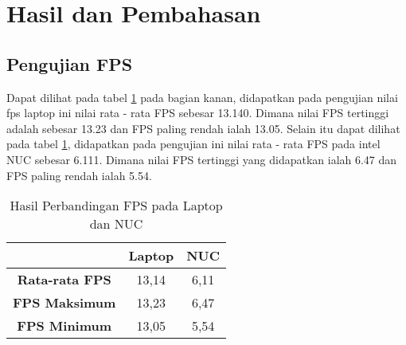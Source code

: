 \section{Hasil dan Pembahasan}
\label{sec:hasildanpembahasan}

\subsection{Pengujian FPS}

Dapat dilihat pada tabel \ref{tb:FPSLaptop} pada bagian kanan, didapatkan pada pengujian nilai fps laptop ini nilai rata - rata FPS sebesar 13.140. Dimana nilai FPS tertinggi adalah sebesar 13.23 dan FPS paling rendah ialah 13.05.  Selain itu dapat dilihat pada tabel \ref{tb:FPSLaptop}, didapatkan pada pengujian ini nilai rata - rata FPS pada intel NUC sebesar 6.111. Dimana nilai FPS tertinggi yang didapatkan ialah 6.47 dan FPS paling rendah ialah 5.54. 
\begin{table}[H]
    \centering
    \caption{Hasil Perbandingan FPS pada Laptop dan NUC}
    \label{tb:FPSLaptop}
    \begin{tabular}{|c|c|c|}
        \hline 
        \cellcolor[HTML]{000000}                        & \cellcolor[HTML]{C0C0C0} \textbf{Laptop}  & \cellcolor[HTML]{C0C0C0} \textbf{NUC}  \\ \hline
        \cellcolor[HTML]{C0C0C0} \textbf{Rata-rata FPS} & 13,14                                      & 6,11                                    \\ \hline
        \cellcolor[HTML]{C0C0C0} \textbf{FPS Maksimum}  & 13,23                                      & 6,47                                   \\ \hline
        \cellcolor[HTML]{C0C0C0} \textbf{FPS Minimum}   & 13,05                                      & 5,54                                    \\ \hline
    \end{tabular}
\end{table}

